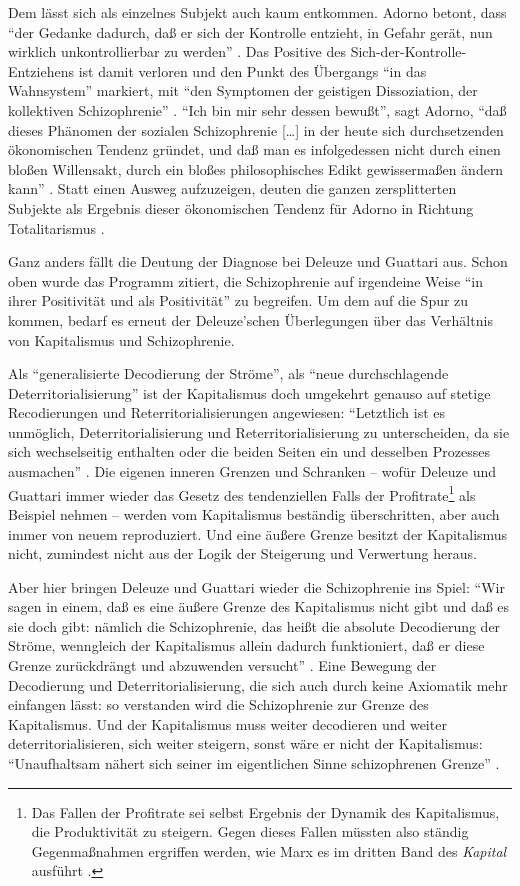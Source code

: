 \documentclass[12pt,
               paper=a4,
               twoside=false,
               onehalfspacing,
               bibliography=totoc,
               toc=graduated,
               ]{scrartcl}
\newcommand{\lips}{\dots\unkern}
\newcommand{\pc}[2]{\parencite[#1]{#2}}
\newcommand{\vgl}[2]{\parencite[vgl.][#1]{#2}}
\newcommand{\dg}{Deleuze und Guattari\xspace}
\begin{document}
Dem lässt sich als einzelnes Subjekt auch kaum entkommen. Adorno
betont, dass "`der Gedanke dadurch, daß er sich der Kontrolle
entzieht, in Gefahr gerät, nun wirklich unkontrollierbar zu werden"'
\pc{229}{vla}. Das Positive des Sich-der-Kontrolle-Entziehens ist
damit verloren und den Punkt des Übergangs "`in das
Wahnsystem"' \pc{229}{vla} markiert, mit "`den Symptomen der geistigen
Dissoziation, der kollektiven Schizophrenie"' \pc{229}{vla}. "`Ich bin
mir sehr dessen bewußt"', sagt Adorno, "`daß dieses Phänomen der
sozialen Schizophrenie [\lips] in der heute sich durchsetzenden
ökonomischen Tendenz gründet, und daß man es infolgedessen nicht durch
einen bloßen Willensakt, durch ein bloßes philosophisches Edikt
gewissermaßen ändern kann"' \pc{274}{vla}. Statt einen Ausweg
aufzuzeigen, deuten die ganzen zersplitterten Subjekte als Ergebnis
dieser ökonomischen Tendenz für Adorno in Richtung Totalitarismus
\vgl{263}{min}.

Ganz anders fällt die Deutung der Diagnose bei \dg aus. Schon oben
wurde das Programm zitiert, die Schizophrenie auf irgendeine Weise
"`in ihrer Positivität und als Positivität"' \pc{24}{schizg} zu
begreifen. Um dem auf die Spur zu kommen, bedarf es erneut der
Deleuze'schen Überlegungen über das Verhältnis von Kapitalismus und
Schizophrenie.

Als "`generalisierte Decodierung der Ströme"', als "`neue
durchschlagende Deterritorialisierung"' \pc{288}{ao} ist der
Kapitalismus doch umgekehrt genauso auf stetige Recodierungen und
Reterritorialisierungen angewiesen: "`Letztlich ist es unmöglich,
Deterritorialisierung und Reterritorialisierung zu unterscheiden, da
sie sich wechselseitig enthalten oder die beiden Seiten ein und
desselben Prozesses ausmachen"' \pc{333}{ao}. Die eigenen inneren
Grenzen und Schranken -- wofür \dg immer wieder das Gesetz des
tendenziellen Falls der Profitrate\footnote{Das Fallen der Profitrate
sei selbst Ergebnis der Dynamik des Kapitalismus, die Produktivität zu
steigern. Gegen dieses Fallen müssten also ständig Gegenmaßnahmen
ergriffen werden, wie Marx es im dritten Band des \emph{Kapital}
ausführt \vgl{221-277}{kap3}.} als Beispiel nehmen \vgl{S. 334 f.}{ao}
-- werden vom Kapitalismus beständig überschritten, aber auch immer
von neuem reproduziert. Und eine äußere Grenze besitzt der
Kapitalismus nicht, zumindest nicht aus der Logik der Steigerung und
Verwertung heraus.

Aber hier bringen Deleuze und Guattari wieder die Schizophrenie ins
Spiel: "`Wir sagen in einem, daß es eine äußere Grenze des
Kapitalismus nicht gibt und daß es sie doch gibt: nämlich die
Schizophrenie, das heißt die absolute Decodierung der Ströme,
wenngleich der Kapitalismus allein dadurch funktioniert, daß er diese
Grenze zurückdrängt und abzuwenden versucht"' \pc{322}{ao}. Eine
Bewegung der Decodierung und Deterritorialisierung, die sich auch
durch keine Axiomatik mehr einfangen lässt: so verstanden wird die
Schizophrenie zur Grenze des Kapitalismus. Und der Kapitalismus muss
weiter decodieren und weiter deterritorialisieren, sich weiter
steigern, sonst wäre er nicht der Kapitalismus: "`Unaufhaltsam nähert
sich seiner im eigentlichen Sinne schizophrenen Grenze"' \pc{44}{ao}.
\end{document}
